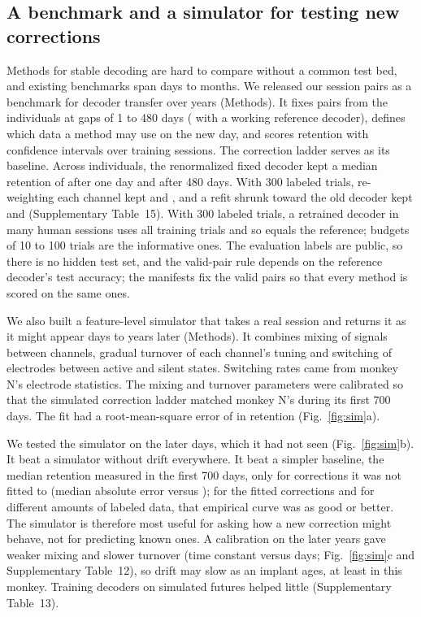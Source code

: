 \documentclass[pdflatex,sn-nature]{sn-jnl}
\begin{document}
\subsection*{A benchmark and a simulator for testing new corrections}

Methods for stable decoding are hard to compare without a common test bed\cite{pei2021nlb,karpowicz2024falcon,
willett2024b2t}, and existing
benchmarks span days to months. We released our session pairs as a benchmark for decoder transfer over years
(Methods). It fixes  pairs from the  individuals at gaps of 1 to 480 days
( with a working reference decoder), defines which data a method may use on the new day, and scores
retention with confidence intervals over training sessions. The correction ladder serves as its baseline. Across
individuals, the renormalized fixed decoder kept a median retention of  after one day and
 after 480 days. With 300 labeled trials, re-weighting each channel kept  and
, and a refit shrunk toward the old decoder kept  and
 (Supplementary Table~15). With 300 labeled trials, a
retrained decoder in many human sessions uses all training trials and so equals the reference; budgets of 10 to 100
trials are the informative ones. The evaluation labels are public, so there is no hidden test set, and the valid-pair
rule depends on the reference decoder's test accuracy; the manifests fix the valid pairs so that every method is scored
on the same ones.

We also built a feature-level simulator that takes a real session and returns it as it might appear days to years later (Methods). It
combines mixing of signals between channels, gradual turnover of each channel's tuning and switching of electrodes
between active and silent states. Switching rates came from monkey N's electrode statistics. The mixing and turnover
parameters were calibrated so that the simulated correction ladder matched monkey N's during its first 700 days. The
fit had a root-mean-square error of  in retention (Fig.~\ref{fig:sim}a).

We tested the simulator on the later days, which it had not seen (Fig.~\ref{fig:sim}b). It beat a simulator without
drift everywhere. It beat a simpler baseline, the median retention measured in the first 700 days, only for corrections
it was not fitted to (median absolute error  versus ); for the fitted corrections
and for different amounts of labeled data, that empirical curve was as good or better. The
simulator is therefore most useful for asking how a new correction might behave, not for predicting known ones. A
calibration on the later years gave weaker mixing and slower turnover (time constant  versus
 days; Fig.~\ref{fig:sim}c and Supplementary Table~12), so drift may slow as an implant ages, at least in this monkey. Training
decoders on simulated futures helped little (Supplementary Table~13).
\end{document}
